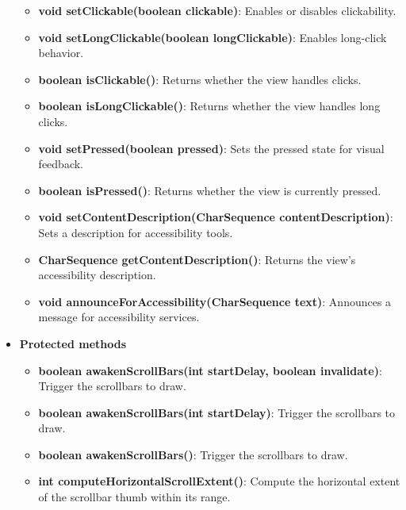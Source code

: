 \documentclass{report}
\begin{document}
\begin{itemize}
\begin{itemize}
                \item \textbf{void setClickable(boolean clickable)}: Enables or disables clickability.
                \item \textbf{void setLongClickable(boolean longClickable)}: Enables long-click behavior.
                \item \textbf{boolean isClickable()}: Returns whether the view handles clicks.
                \item \textbf{boolean isLongClickable()}: Returns whether the view handles long clicks.
                \item \textbf{void setPressed(boolean pressed)}: Sets the pressed state for visual feedback.
                \item \textbf{boolean isPressed()}: Returns whether the view is currently pressed.

                \item \textbf{void setContentDescription(CharSequence contentDescription)}: Sets a description for accessibility tools.
                \item \textbf{CharSequence getContentDescription()}: Returns the view’s accessibility description.
                \item \textbf{void announceForAccessibility(CharSequence text)}: Announces a message for accessibility services.
            \end{itemize}
        \item \textbf{Protected methods}
            \begin{itemize}
                \item \textbf{boolean awakenScrollBars(int startDelay, boolean invalidate)}:  
                    Trigger the scrollbars to draw.

                \item \textbf{boolean awakenScrollBars(int startDelay)}:  
                    Trigger the scrollbars to draw.

                \item \textbf{boolean awakenScrollBars()}:  
                    Trigger the scrollbars to draw.

                \item \textbf{int computeHorizontalScrollExtent()}:  
                    Compute the horizontal extent of the scrollbar thumb within its range.


\end{itemize}
\end{itemize}
\end{document}
